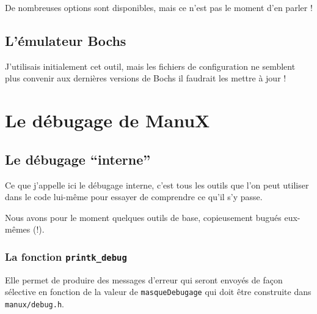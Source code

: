    De nombreuses options sont disponibles, mais ce n'est pas le moment
d'en parler !

%
\subsection{L'émulateur Bochs}

   J'utilisais initialement cet outil, mais les fichiers de
configuration ne semblent plus convenir aux dernières versions de
Bochs {} \cite{bochs-website} il faudrait les mettre à jour !

%
\section{Le débugage de ManuX}

%
\subsection{Le débugage ``interne''}
\label{subsection:debugage_interne}

   Ce que j'appelle ici le débugage interne, c'est tous les outils que
l'on peut utiliser dans le code lui-même pour essayer de comprendre ce
qu'il s'y passe.

   Nous avons pour le moment quelques outils de base, copieusement bugués
eux-mêmes (!).

%
\subsubsection{La fonction {\tt printk\_debug}}

   Elle permet de produire des messages d'erreur qui seront envoyés de
façon sélective en fonction de la valeur de \lstinline!masqueDebugage!
qui doit être construite dans {\tt manux/debug.h}.

%
